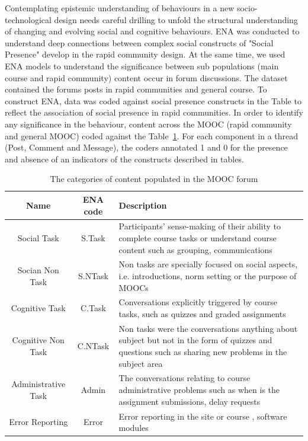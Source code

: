 \documentclass[manuscript,screen,review]{acmart}
\begin{document}
Contemplating epistemic understanding of behaviours in a new socio-technological design needs careful drilling to unfold the structural understanding of changing and evolving social and cognitive behaviours. ENA was conducted to understand deep connections between complex  social constructs of "Social Presence" develop in the rapid community design. At the same time, we used ENA models to understand the significance between sub populations (main course and rapid community) content occur in forum discussions. The dataset contained the forums posts in rapid communities and general course. To construct ENA, data was coded  against social presence constructs in the Table to reflect the association of social presence in rapid communities. In order to identify any significance in the behaviour, content across the MOOC (rapid community and general MOOC) coded against the Table~\ref{tab:ENAContent}. For each component in a thread (Post, Comment and Message), the coders annotated 1 and 0 for the presence and absence of an indicators of the constructs described in tables.  

\begin{table}[h!]
\caption{The categories of content populated in the MOOC forum}
\label{tab:ENAContent}
\begin{center}
    \begin{tabular}{c|c|p{7cm}}
    \toprule
     Name & ENA code & Description  \\
     \midrule
     Social Task  & S.Task  & Participants’ sense-making of their ability to complete course tasks or understand course content such as grouping,                                        communications          
     \\ \hline
    Socian Non Task  & S.NTask & Non tasks are specially focused on social aspects, i.e. introductions, norm setting or the purpose of MOOCs                    
    \\ \hline
    Cognitive Task  & C.Task  & Conversations explicitly triggered by course tasks, such as quizzes and graded assignments 
    \\ \hline
    Cognitive Non Task & C.NTask & Non tasks were the conversations anything about subject but not in the form of quizzes and questions such as sharing new problems in the subject area 
    \\ \hline
    Administrative Task & Admin & The conversations relating to course administrative problems such as when is the assignment submissions, delay requests 
    \\ \hline
    Error Reporting & Error & Error  reporting in the site or course , software modules   
    \bottomrule
    \end{tabular}
    \end{center}
    \end{table}
\end{document}
